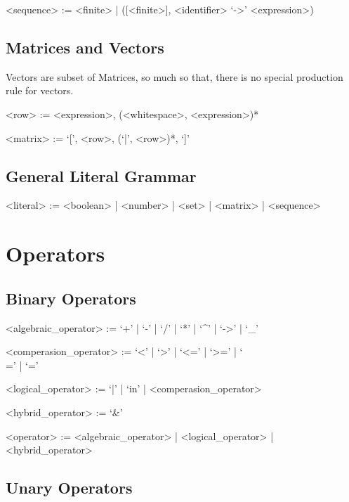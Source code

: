 \documentclass[11pt,a4paper]{book}
\begin{document}
\begin{grammar}
<sequence> := <finite> | ([<finite>], <identifier> `->' <expression>)
\end{grammar}

\subsection{Matrices and Vectors}

Vectors are subset of Matrices, so much so that, there is no special production rule for vectors.

\begin{grammar}
<row> := <expression>, (<whitespace>, <expression>)*

<matrix> := `[', <row>, (`|', <row>)*, `]'

\end{grammar}

\subsection{General Literal Grammar}

\begin{grammar}
<literal> := <boolean> | <number> | <set> | <matrix> | <sequence>
\end{grammar}

\section{Operators}

\subsection{Binary Operators}

\begin{grammar}

<algebraic\_operator> := `+' | `-' | `/' | `*' | `^' | `->' | `_' 

<comperasion\_operator> := `<' | `>' | `<=' | `>=' | `\\=' | `='

<logical\_operator> := `|' | `in' | <comperasion\_operator>

<hybrid\_operator> := `&'

<operator> := <algebraic\_operator> | <logical\_operator> | <hybrid\_operator>

\end{grammar}

\subsection{Unary Operators}
\end{document}
